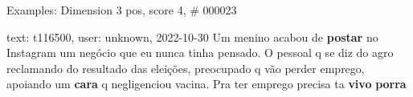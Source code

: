 \begin{frame}{Examples: Dimension 3 pos, score 4, \# 000023}
\footnotesize
\begin{exampleblock}{text: t116500, user: unknown, 2022-10-30}
Um menino acabou de \textbf{postar} no Instagram um negócio que eu nunca tinha 
pensado. O pessoal q se diz do agro reclamando do resultado das eleições, 
preocupado q vão perder emprego, apoiando um \textbf{cara} q negligenciou 
vacina. Pra ter emprego precisa ta \textbf{vivo} \textbf{porra} 
\end{exampleblock}
\end{frame}
